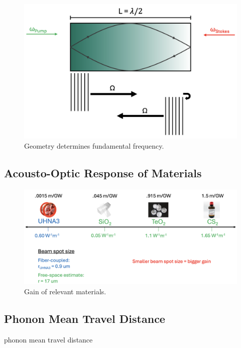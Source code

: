 \begin{figure}[t]
  \centering
  \includegraphics[width=.85\textwidth]{figs/4-Raman/GeometryDeterminesFundamentalFreq.png}
  \caption{Geometry determines fundamental frequency.}
  \label{fig:Raman:GeometryDeterminesFundamentalFreq}
\end{figure}

\subsection{Acousto-Optic Response of Materials}
\label{subsec:Raman:Acousto-OpticResponse}

\begin{figure}[t]
  \centering
  \includegraphics[width=\textwidth]{figs/4-Raman/GainOfRelevantMaterials.png}
  \caption{Gain of relevant materials.}
  \label{fig:Raman:GainOfRelevantMaterials}
\end{figure}

\subsection{Phonon Mean Travel Distance}
\label{subsec:Raman:PhononMeanTravelDistance}

phonon mean travel distance

